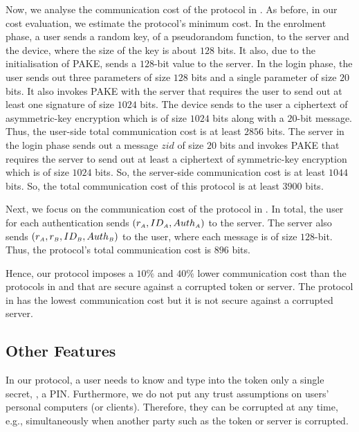 Now, we analyse the communication cost of the protocol in \cite{JareckiJKSS21}. As before, in our cost evaluation, we estimate the protocol's minimum cost.  In the enrolment phase, a user sends a random key, of a pseudorandom function, to the server and the device, where the size of the key is about $128$ bits. It also, due to the initialisation of PAKE, sends a $128$-bit value to the server. In the login phase, the user sends out three parameters of size $128$ bits and a single parameter of size $20$ bits.  It also invokes PAKE with the server that requires the user to send out at least one signature of size $1024$ bits. The device sends to the user a ciphertext of asymmetric-key encryption which is of size $1024$ bits along with a $20$-bit message. Thus, the user-side total communication cost is at least $2856$ bits. The server in the login phase sends out a message $zid$ of size $20$ bits and invokes PAKE that requires the server to send out at least a ciphertext of symmetric-key encryption which is of size $1024$ bits.  So, the server-side communication cost is at least $1044$ bits. So, the total communication cost of this protocol is at least $3900$ bits. 

Next, we focus on the communication cost of the protocol in \cite{MatsuoMY11}. In total, the user for each authentication sends   $(r_{\scriptscriptstyle A}, ID_{\scriptscriptstyle A}, Auth_{\scriptscriptstyle A})$ to the server. The server also sends $(r_{\scriptscriptstyle A}, r_{\scriptscriptstyle B}, ID_{\scriptscriptstyle B}, Auth_{\scriptscriptstyle B})$ to the user, where each message is of size $128$-bit. Thus, the protocol's total communication cost is $896$ bits. 


Hence, our protocol imposes a $10\%$ and $40\%$ lower communication cost than the protocols in \cite{WangW18} and \cite{JareckiJKSS21} that are secure against a corrupted token or server. The protocol in \cite{MatsuoMY11} has the lowest communication cost but it is not secure against a corrupted server. 


\subsection{Other Features}
 In our protocol, a user needs to know and type into the token only a single secret, \ie, a PIN. Furthermore, we do not put any trust assumptions on users' personal computers (or clients). Therefore, they can be corrupted at any time, e.g., simultaneously when another party such as the token or server is corrupted. 
 
